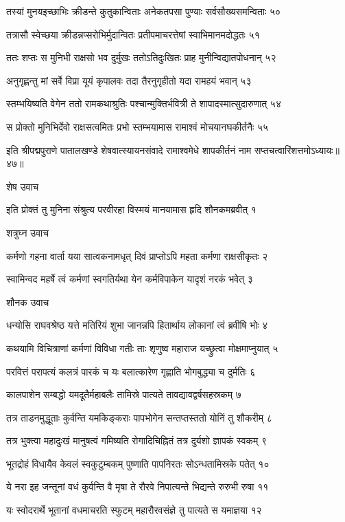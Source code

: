 तस्यां मुनयइच्छाभिः क्रीडन्ते कुतुकान्विताः
अनेकतपसा पुण्याः सर्वसौख्यसमन्विताः ५०

तत्रासौ स्वेच्छया क्रीडन्नप्सरोभिर्मुदान्वितः
प्रतीपमाचरत्तेषां स्वाभिमानमदोद्धतः ५१

ततः शप्तः स मुनिभी राक्षसो भव दुर्मुखः
ततोऽतिदुःखितः प्राह मुनीन्विद्यातपोधनान् ५२

अनुगृह्णन्तु मां सर्वे विप्रा यूयं कृपालवः
तदा तैरनुगृहीतो यदा रामहयं भवान् ५३

स्तम्भयिष्यति वेगेन ततो रामकथाश्रुतिः
पश्चान्मुक्तिर्भवित्री ते शापादस्मात्सुदारुणात् ५४

स प्रोक्तो मुनिभिर्देवो राक्षसत्वमितः प्रभो
स्तम्भयामास रामाश्वं मोचयानघकीर्तनैः ५५

इति श्रीपद्मपुराणे पातालखण्डे शेषवात्स्यायनसंवादे रामाश्वमेधे शापकीर्तनं नाम सप्तचत्वारिंशत्तमोऽध्यायः॥४७॥


शेष उवाच

इति प्रोक्तं तु मुनिना संश्रुत्य परवीरहा
विस्मयं मानयामास हृदि शौनकमब्रवीत् १

शत्रुघ्न उवाच

कर्मणो गहना वार्ता यया सात्वकनामधृत्
दिवं प्राप्तोऽपि महता कर्मणा राक्षसीकृतः २

स्वामिन्वद महर्षे त्वं कर्मणां स्वगतिर्यथा
येन कर्मविपाकेन यादृशं नरकं भवेत् ३

शौनक उवाच

धन्योसि राघवश्रेष्ठ यत्ते मतिरियं शुभा
जानन्नपि हितार्थाय लोकानां त्वं ब्रवीषि भोः ४

कथयामि विचित्राणां कर्मणां विविधा गतीः
ताः शृणुष्व महाराज यच्छ्रुत्वा मोक्षमाप्नुयात् ५

परवित्तं परापत्यं कलत्रं पारकं च यः
बलात्कारेण गृह्णाति भोगबुद्ध्या च दुर्मतिः ६

कालपाशेन सम्बद्धो यमदूतैर्महाबलैः
तामिस्रे पात्यते तावद्यावद्वर्षसहस्रकम् ७

तत्र ताडनमुद्धूताः कुर्वन्ति यमकिङ्कराः
पापभोगेन सन्तप्तस्ततो योनिं तु शौकरीम् ८

तत्र भुक्त्वा महादुःखं मानुषत्वं गमिष्यति
रोगादिचिह्नितं तत्र दुर्यशो ज्ञापकं स्वकम् ९

भूतद्रोहं विधायैव केवलं स्वकुटुम्बकम्
पुष्णाति पापनिरतः सोऽन्धतामिस्रके पतेत् १०

ये नरा इह जन्तूनां वधं कुर्वन्ति वै मृषा
ते रौरवे निपात्यन्ते भिद्यन्ते रुरुभी रुषा ११

यः स्वोदरार्थे भूतानां वधमाचरति स्फुटम्
महारौरवसंज्ञे तु पात्यते स यमाज्ञया १२

